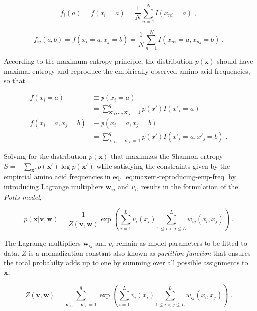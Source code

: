 \documentclass[12pt,a4paper,twoside]{book}
\newcommand{\eq}{\!=\!}
\newcommand{\seq}{\mathbf{x}}
\renewcommand{\v}{\mathbf{v}}
\newcommand{\vi}{v_{i}}
\newcommand{\w}{\mathbf{w}}
\newcommand{\wij}{\mathbf{w}_{ij}}
\theoremstyle{definition}
\theoremstyle{definition}
\theoremstyle{remark}
\begin{document}
\begin{equation}
    f_i(a) = f(x_i\eq a) = \frac{1}{N}\sum_{n=1}^N I(x_{ni} \eq a) \; ,
\end{equation}

\begin{equation}
    f_{ij}(a,b) = f(x_i\eq a, x_j\eq b) = \frac{1}{N} \sum_{n=1}^N I(x_{ni} \eq a, x_{nj} \eq b) \; .
 \label{eq:emp-freq}
\end{equation}

According to the maximum entropy principle, the distribution \(p(\seq)\)
should have maximal entropy and reproduce the empirically observed amino
acid frequencies, so that

\begin{align}
   f(x_i\eq a)            &\equiv p(x_i\eq a)  \nonumber\\
                                    &= \sum_{\seq\prime_1, \ldots, \seq\prime_L = 1}^{q} p(x\prime) I(x\prime_i \eq a) \\
  f(x_i\eq a, x_j\eq b)   &\equiv p(x_i\eq a, x_j \eq b) \nonumber \\
                                    &= \sum_{\seq\prime_1, \ldots, \seq\prime_L = 1}^{q}  p(x\prime) I(x\prime_i\eq a, x\prime_j \eq b)  \; .
 \label{eq:maxent-reproducing-emp-freq}
\end{align}

Solving for the distribution \(p(\seq)\) that maximizes the Shannon
entropy \(S= -\sum_{\seq\prime} p(\seq\prime) \log p(\seq\prime)\) while
satisfying the constraints given by the empircial amino acid frequencies
in eq. \eqref{eq:maxent-reproducing-emp-freq} by introducing Lagrange
multipliers \(\wij\) and \(\vi\), results in the formulation of the
\emph{Potts model},

\begin{equation}
    p(\seq | \v, \w ) = \frac{1}{Z(\v, \w)} \exp \left( \sum_{i=1}^L v_i(x_i) \sum_{1 \leq i < j \leq L}^L w_{ij}(x_i, x_j) \right) \; .
\label{eq:max-ent-model}
\end{equation}

The Lagrange multipliers \(\wij\) and \(\vi\) remain as model parameters
to be fitted to data. \(Z\) is a normalization constant also known as
\emph{partition function} that ensures the total probabilty adds up to
one by summing over all possible assignments to \(\seq\),

\begin{equation}
  Z(\v, \w) = \sum_{\seq\prime_1, \ldots, \seq\prime_L = 1}^{q} \exp  \left( \sum_{i=1}^L v_i(x_i) \sum_{1 \leq i < j \leq L}^L w_{ij}(x_i, x_j) \right) \; .
  \label{eq:partition-fct-likelihood}
\end{equation}
\end{document}
